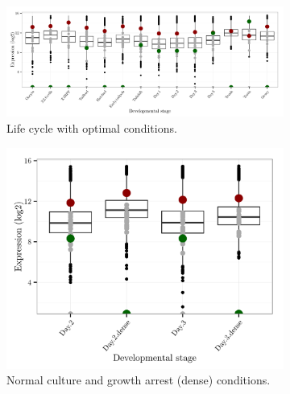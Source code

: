 \documentclass[11pt,twoside,a4paper]{report}
\begin{document}
	\begin{figure}[h!]
		\setlength{\belowcaptionskip}{5pt}
		\centering
		\begin{subfigure}{1\textwidth}
			\centering
			\includegraphics[width=1\textwidth]{pngs/Dot1_expression_allgenes_SETs.png}
			\caption{Life cycle with optimal conditions.}
		\end{subfigure}	
		\begin{subfigure}{.5\textwidth}
			\centering
			\includegraphics[width=1\linewidth]{pngs/Dot1_expression_allgenes_SETs_dense_noDay4.png}
			\caption{Normal culture and growth arrest (dense) conditions.}
		\end{subfigure}%
		\begin{subfigure}{.5\textwidth}
			\centering

\end{subfigure}
\end{figure}
\end{document}
